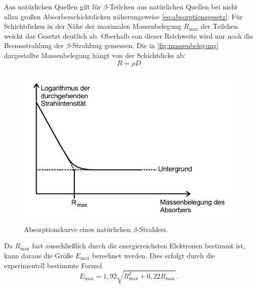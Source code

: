 Aus natürlichen Quellen gilt für $\beta$-Teilchen aus natürlichen Quellen 
bei nicht allzu großen Absorberschichtdicken näherungsweise \autoref{eq:absorptionsgesetz}. 
Für Schichtdicken in der Nähe der maximalen Massenbelegung $R_\text{max}$ der Teilchen weicht das Gesetzt deutlich ab. 
Oberhalb von dieser Reichweite wird nur noch die Bremsstrahlung der $\beta$-Strahlung gemessen.
Die in \autoref{fig:massenbelegung} dargestellte Massenbelegung hängt von der Schichtdicke ab:
\begin{equation}
    R = \rho D
\end{equation}
\begin{figure}
    \centering
    \includegraphics[width=0.6\linewidth]{pictures/massenbelegung.pdf}
    \caption{Absorptionskurve eines natürlichen $\beta$-Strahlers. \cite{v704}}
    \label{fig:massenbelegung}
\end{figure}
Da $R_\text{max}$ fast ausschließlich durch die energiereichsten Elektronen bestimmt ist, kann
daraus die Größe $E_\text{max}$ berechnet werden. 
Dies erfolgt durch die experimentell bestimmte Formel
\begin{equation}
    E_\text{max}= 1,92 \sqrt{R_\text{max}^{2}+ 0,22 R_\text{max}} \, .
\end{equation}